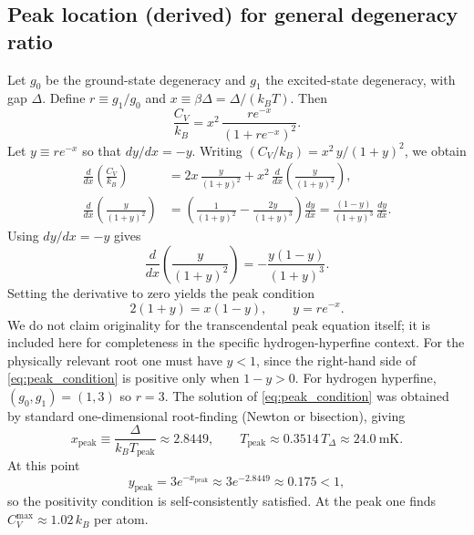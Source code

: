 \documentclass[11pt,a4paper]{article}
\begin{document}
    \subsection{Peak location (derived) for general degeneracy ratio}
        Let $g_0$ be the ground-state degeneracy and $g_1$ the excited-state degeneracy, with gap $\Delta$.
        Define $r\equiv g_1/g_0$ and $x\equiv \beta\Delta=\Delta/(k_B T)$.
        Then
        \begin{equation}
            \frac{C_V}{k_B} = x^2\,\frac{r e^{-x}}{(1+r e^{-x})^2}.
            \label{eq:Cv_x}
        \end{equation}
        Let $y\equiv r e^{-x}$ so that $dy/dx=-y$. Writing $(C_V/k_B)=x^2\,y/(1+y)^2$, we obtain
        \begin{align}
            \frac{d}{dx}\left(\frac{C_V}{k_B}\right)
            &=
            2x\,\frac{y}{(1+y)^2}
            +
            x^2\,\frac{d}{dx}\left(\frac{y}{(1+y)^2}\right),
            \\[4pt]
            \frac{d}{dx}\left(\frac{y}{(1+y)^2}\right)
            &=
            \left(\frac{1}{(1+y)^2}-\frac{2y}{(1+y)^3}\right)\frac{dy}{dx}
            =
            \frac{(1-y)}{(1+y)^3}\,\frac{dy}{dx}.
        \end{align}
        Using $dy/dx=-y$ gives
        \begin{equation}
            \frac{d}{dx}\left(\frac{y}{(1+y)^2}\right)
            =
            -\frac{y(1-y)}{(1+y)^3}.
        \end{equation}
        Setting the derivative to zero yields the peak condition
        \begin{equation}
            \boxed{
                2(1+y)=x(1-y),
                \qquad y=r e^{-x}.
            }
            \label{eq:peak_condition}
        \end{equation}
        We do not claim originality for the transcendental peak equation itself; it is included here for completeness in the specific hydrogen-hyperfine context.
        For the physically relevant root one must have $y<1$, since the right-hand side of
        \eqref{eq:peak_condition} is positive only when $1-y>0$.
        For hydrogen hyperfine, $(g_0,g_1)=(1,3)$ so $r=3$. The solution of \eqref{eq:peak_condition}
        was obtained by standard one-dimensional root-finding (Newton or bisection), giving
        \begin{equation}
            x_{\mathrm{peak}}\equiv \frac{\Delta}{k_B T_{\mathrm{peak}}}\approx 2.8449,
            \qquad
            T_{\mathrm{peak}}\approx 0.3514\,T_\Delta \approx 24.0~\mathrm{mK}.
            \label{eq:Tpeak}
        \end{equation}
        At this point
        \[
            y_{\mathrm{peak}}=3e^{-x_{\mathrm{peak}}}\approx 3e^{-2.8449}\approx 0.175<1,
        \]
        so the positivity condition is self-consistently satisfied.
        At the peak one finds $C_V^{\max}\approx 1.02\,k_B$ per atom.
        
\end{document}
